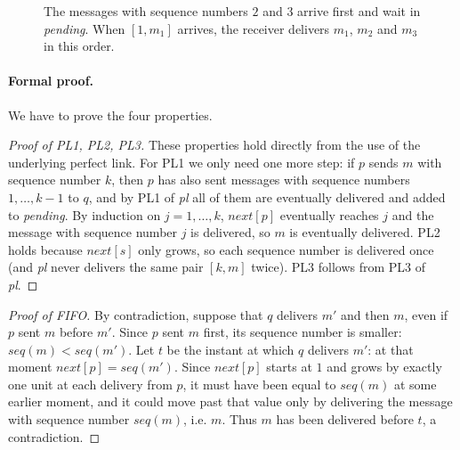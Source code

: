 \begin{figure}[H]
  \centering
  \caption{The messages with sequence numbers $2$ and $3$ arrive first and wait in \textit{pending}. When $[1, m_1]$ arrives, the receiver delivers $m_1$, $m_2$ and $m_3$ in this order.}
\end{figure}

\paragraph{Formal proof.} We have to prove the four properties.

\begin{proof}[Proof of PL1, PL2, PL3]
  These properties hold directly from the use of the underlying perfect link. For PL1 we only need one more step: if $p$ sends $m$ with sequence number $k$, then $p$ has also sent messages with sequence numbers $1, \ldots, k-1$ to $q$, and by PL1 of \textit{pl} all of them are eventually delivered and added to \textit{pending}. By induction on $j = 1, \ldots, k$, $\textit{next}[p]$ eventually reaches $j$ and the message with sequence number $j$ is delivered, so $m$ is eventually delivered. PL2 holds because $\textit{next}[s]$ only grows, so each sequence number is delivered once (and \textit{pl} never delivers the same pair $[k,m]$ twice). PL3 follows from PL3 of \textit{pl}.
\end{proof}

\begin{proof}[Proof of FIFO]
  By contradiction, suppose that $q$ delivers $m'$ and then $m$, even if $p$ sent $m$ before $m'$. Since $p$ sent $m$ first, its sequence number is smaller: $\textit{seq}(m) < \textit{seq}(m')$. Let $t$ be the instant at which $q$ delivers $m'$: at that moment $\textit{next}[p] = \textit{seq}(m')$. Since $\textit{next}[p]$ starts at $1$ and grows by exactly one unit at each delivery from $p$, it must have been equal to $\textit{seq}(m)$ at some earlier moment, and it could move past that value only by delivering the message with sequence number $\textit{seq}(m)$, i.e. $m$. Thus $m$ has been delivered before $t$, a contradiction.
\end{proof}
